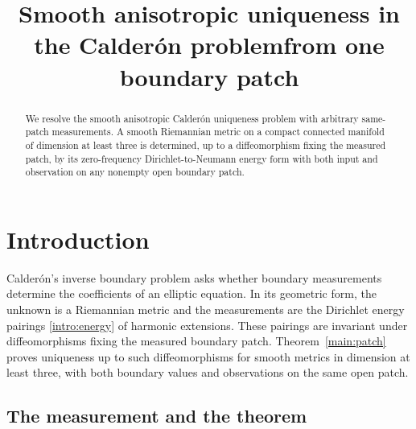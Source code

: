 \documentclass[11pt,a4paper]{article}
\title{Smooth anisotropic uniqueness in the Calder\'on problem\newline from one boundary patch}
\date{}
\theoremstyle{definition}
\theoremstyle{remark}
\numberwithin{equation}{section}
\begin{document}
\maketitle
\begin{abstract}
We resolve the smooth anisotropic Calder\'on uniqueness problem with
arbitrary same-patch measurements. A smooth Riemannian metric on a compact
connected manifold of dimension at least three is determined, up to a
diffeomorphism fixing the measured patch, by its zero-frequency
Dirichlet-to-Neumann energy form with both input and observation on any
nonempty open boundary patch.
\end{abstract}
{\footnotesize\tableofcontents}
\clearpage
\section{Introduction}
\label{intro:section}

Calder\'on's inverse boundary problem asks whether boundary measurements
determine the coefficients of an elliptic equation. In its geometric
form, the unknown is a Riemannian metric and the measurements are the
Dirichlet energy pairings \eqref{intro:energy} of harmonic extensions.
These pairings are invariant under diffeomorphisms fixing the measured
boundary patch. Theorem~\ref{main:patch} proves uniqueness up to such
diffeomorphisms for smooth metrics in dimension at least three, with
both boundary values and observations on the same open patch.

\subsection{The measurement and the theorem}
\end{document}
